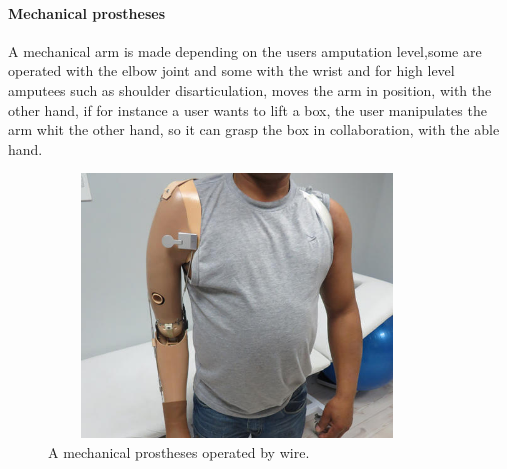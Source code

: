 \paragraph{Mechanical prostheses}
A mechanical arm is made depending on the users amputation level,some are operated with the elbow joint and some with the wrist and for high level amputees such as shoulder disarticulation, moves the arm in position, with the other hand, if for instance a user wants to lift a box, the user manipulates the arm whit the other hand, so it can grasp the box in collaboration, with the able hand. 
\begin{figure}[H]
    \centering
    \includegraphics[width=10cm,height=7cm]{Figures/Contextual_figures/ProsthesesPics/above-elbow-prosthesis-500x500.jpg}
    \caption{A mechanical prostheses operated by wire\cite{AEP}.}
    \label{fig:AEP}
\end{figure}
